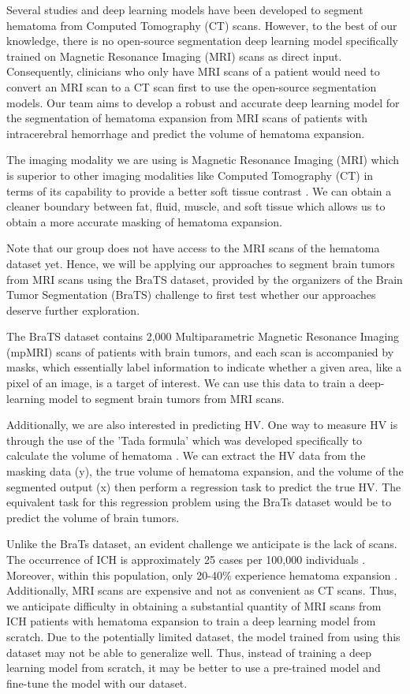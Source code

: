 \documentclass[11pt, journal, a4paper]{IEEEtran}
\begin{document}
Several studies and deep learning models have been developed to segment hematoma from Computed Tomography (CT) scans. However, to the best of our knowledge, there is no open-source segmentation deep learning model specifically trained on Magnetic Resonance Imaging (MRI) scans as direct input. Consequently, clinicians who only have MRI scans of a patient would need to convert an MRI scan to a CT scan first to use the open-source segmentation models. Our team aims to develop a robust and accurate deep learning model for the segmentation of hematoma expansion from MRI scans of patients with intracerebral hemorrhage and predict the volume of hematoma expansion. 

The imaging modality we are using is Magnetic Resonance Imaging (MRI) which is superior to other imaging modalities like Computed Tomography (CT) in terms of its capability to provide a better soft tissue contrast \cite{CenterforDevicesandRadiologicalHealth}. We can obtain a cleaner boundary between fat, fluid, muscle, and soft tissue which allows us to obtain a more accurate masking of hematoma expansion.

Note that our group does not have access to the MRI scans of the hematoma dataset yet. Hence, we will be applying our approaches to segment brain tumors from MRI scans using the BraTS dataset, provided by the organizers of the Brain Tumor Segmentation (BraTS) challenge to first test whether our approaches deserve further exploration. 

The BraTS dataset contains 2,000 Multiparametric Magnetic Resonance Imaging (mpMRI) scans of patients with brain tumors, and each scan is accompanied by masks, which essentially label information to indicate whether a given area, like a pixel of an image, is a target of interest. We can use this data to train a deep-learning model to segment brain tumors from MRI scans. 

Additionally, we are also interested in predicting HV. One way to measure HV is through the use of the 'Tada formula' which was developed specifically to calculate the volume of hematoma \cite{sha2023improvements}. We can extract the HV data from the masking data (y), the true volume of hematoma expansion, and the volume of the segmented output (x) then perform a regression task to predict the true HV. The equivalent task for this regression problem using the BraTs dataset would be to predict the volume of brain tumors.

Unlike the BraTs dataset, an evident challenge we anticipate is the lack of scans. The occurrence of ICH is approximately 25 cases per 100,000 individuals \cite{faghih2021mortality}. Moreover, within this population, only 20-40\% experience hematoma expansion \cite{haupenthal2023hematoma}. Additionally, MRI scans are expensive and not as convenient as CT scans. Thus, we anticipate difficulty in obtaining a substantial quantity of MRI scans from ICH patients with hematoma expansion to train a deep learning model from scratch. Due to the potentially limited dataset, the model trained from using this dataset may not be able to generalize well. Thus, instead of training a deep learning model from scratch, it may be better to use a pre-trained model and fine-tune the model with our dataset. 
\end{document}
